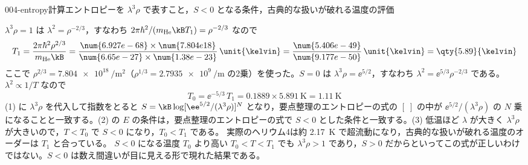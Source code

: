 \documentclass[uplatex,dvipdfmx,a4paper,11pt]{jsarticle}
\begin{document}
\begin{mondai}{004-entropy}{計算}{エントロピーを $\lambda^{3}\rho$ で表すこと，$S<0$ となる条件，古典的な扱いが破れる温度の評価}
\begin{tadashii}
 $\lambda^{3}\rho=1$ は $\lambda^{2}=\rho^{-2/3}$，すなわち $2\pi\hbar^{2}/(m_{\mathrm{He}}\kB T_1)=\rho^{-2/3}$ なので
\[ T_1=\frac{2\pi\hbar^{2}\rho^{2/3}}{m_{\mathrm{He}}\kB}=\frac{\num{6.927e-68}\times\num{7.804e18}}{\num{6.65e-27}\times\num{1.38e-23}}\,\unit{\kelvin}=\frac{\num{5.406e-49}}{\num{9.177e-50}}\,\unit{\kelvin}=\qty{5.89}{\kelvin} \]
ここで $\rho^{2/3}=\qty{7.804e18}{\per\metre\squared}$（$\rho^{1/3}=\qty{2.7935e9}{\per\metre}$ の2乗）を使った。$S=0$ は $\lambda^{3}\rho=\ee^{5/2}$，すなわち $\lambda^{2}=\ee^{5/3}\rho^{-2/3}$ である。$\lambda^{2}\propto1/T$ なので
\[ T_0=\ee^{-5/3}\,T_1=\num{0.1889}\times\qty{5.891}{\kelvin}=\qty{1.11}{\kelvin} \]
\kenzan (1) に $\lambda^{3}\rho$ を代入して指数をとると $S=\kB\log[\ee^{5/2}/(\lambda^{3}\rho)]^{N}$ となり，要点整理のエントロピーの式の $[\;]$ の中が $\ee^{5/2}/(\lambda^{3}\rho)$ の $N$ 乗になることと一致する。(2) の $E$ の条件は，要点整理のエントロピーの式で $S<0$ とした条件と一致する。(3) 低温ほど $\lambda$ が大きく $\lambda^{3}\rho$ が大きいので，$T<T_0$ で $S<0$ になり，$T_0<T_1$ である。 実際のヘリウム4は約 \qty{2.17}{\kelvin} で超流動になり，古典的な扱いが破れる温度のオーダーは $T_1$ と合っている。
\tsumazuki $S<0$ になる温度 $T_0$ より高い $T_0<T<T_1$ でも $\lambda^{3}\rho>1$ であり，$S>0$ だからといってこの式が正しいわけではない。$S<0$ は数え間違いが目に見える形で現れた結果である。
\end{tadashii}
\end{mondai}
\end{document}
